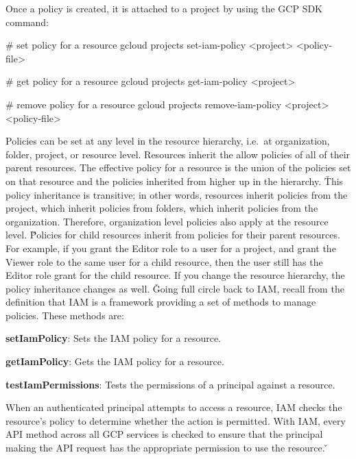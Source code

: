 Once a policy is created, it is attached to a project by using the GCP SDK command:
\begin{bash}
# set policy for a resource
gcloud projects set-iam-policy <project> <policy-file>
\end{bash}

\begin{bash}
# get policy for a resource
gcloud projects get-iam-policy <project>
\end{bash}

\begin{bash}
# remove policy for a resource
gcloud projects remove-iam-policy <project> <policy-file>
\end{bash}

Policies can be set at any level in the resource hierarchy, i.e.\ at organization, folder, project, or resource level.
Resources inherit the allow policies of all of their parent resources. The effective policy for a resource is the
union of the policies set on that resource and the policies inherited from higher up in the hierarchy. \v

This policy inheritance is transitive; in other words, resources inherit policies from the project, which inherit
policies from folders, which inherit policies from the organization. Therefore, organization level policies also
apply at the resource level. \v

Policies for child resources inherit from policies for their parent resources. For example, if you grant
the Editor role to a user for a project, and grant the Viewer role to the same user for a child resource, then the
user still has the Editor role grant for the child resource. If you change the resource hierarchy, the policy
inheritance changes as well. \v

Going full circle back to IAM, recall from the definition that IAM is a framework providing a set of methods to manage
policies. These methods are:
\bit
\item \textbf{setIamPolicy}: Sets the IAM policy for a resource.
\item \textbf{getIamPolicy}: Gets the IAM policy for a resource.
\item \textbf{testIamPermissions}: Tests the permissions of a principal against a resource.
\eit

When an authenticated principal attempts to access a resource, IAM checks the resource's policy to determine whether
the action is permitted. With IAM, every API method across all GCP services is checked to ensure that the principal
making the API request has the appropriate permission to use the resource. \v

